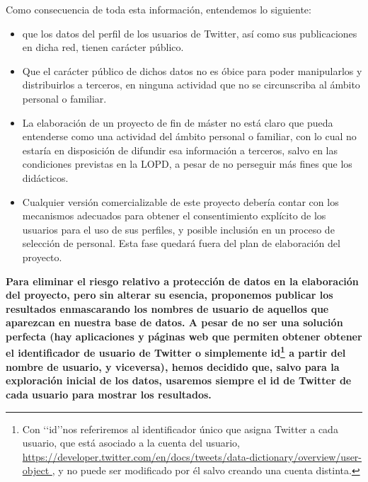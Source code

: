 Como consecuencia de toda esta información, entendemos lo siguiente:
\begin{itemize}
\item que los datos del perfil de los usuarios de Twitter, así como sus publicaciones en dicha red,
tienen carácter público.
\item Que el carácter público de dichos datos no es óbice para poder manipularlos y distribuirlos
a terceros, en ninguna actividad que no se circunscriba al ámbito personal o familiar.
\item La elaboración de un proyecto de fin de máster no está claro
que pueda entenderse como una actividad del ámbito personal o familiar, con lo cual no estaría en disposición de difundir esa información a terceros, salvo en las condiciones previstas en la LOPD,
a pesar de no perseguir más fines que los didácticos.
\item Cualquier versión comercializable de este proyecto debería contar con los mecanismos
adecuados para obtener el consentimiento explícito de los usuarios para el uso de sus perfiles, 
y posible inclusión en un proceso de selección de personal. Esta fase quedará fuera del plan de elaboración
del proyecto.
\end{itemize}
{\bf\color{oblue}
\label{note:why_only_user_id}
Para eliminar el riesgo relativo a protección de datos en la elaboración del proyecto, 
pero sin alterar su esencia, proponemos publicar los resultados enmascarando los nombres 
de usuario de aquellos que aparezcan en nuestra base de datos. A pesar de no ser una solución
perfecta (hay aplicaciones y páginas web que permiten obtener obtener el identificador de usuario
de Twitter o simplemente id\footnote{Con \lq\lq id\rq\rq nos referiremos al identificador único 
que asigna Twitter a cada usuario, que está asociado a la cuenta del usuario, \url{https://developer.twitter.com/en/docs/tweets/data-dictionary/overview/user-object },
y no puede ser modificado por él salvo creando una cuenta distinta.}
a partir del nombre de usuario, y viceversa), hemos decidido que, salvo 
para la exploración inicial de los datos, usaremos siempre el id de Twitter de
cada usuario para mostrar los resultados. }

